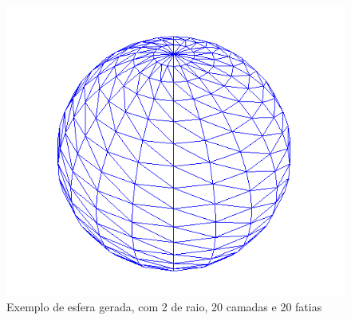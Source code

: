 \begin{figure}[<+htpb+>]
	\centering
	\includegraphics[scale=0.5]{imagens/p3_esfera_2_20_20.png}
	\caption{Exemplo de esfera gerada, com 2 de raio, 20 camadas e 20 fatias}
	\label{p1:fig:p3_esfera_2_20_20}
\end{figure}




